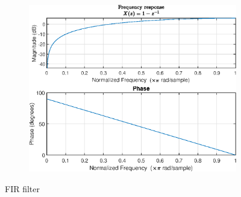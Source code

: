 \begin{figure}
\begin{subfigure}{\linewidth}
\centering
\includegraphics[scale=0.9]{images/freq_res_1.eps}
\caption{}
\label{fig:sub3}
\end{subfigure}
\caption{FIR filter}
\label{fig:test}
\end{figure}

